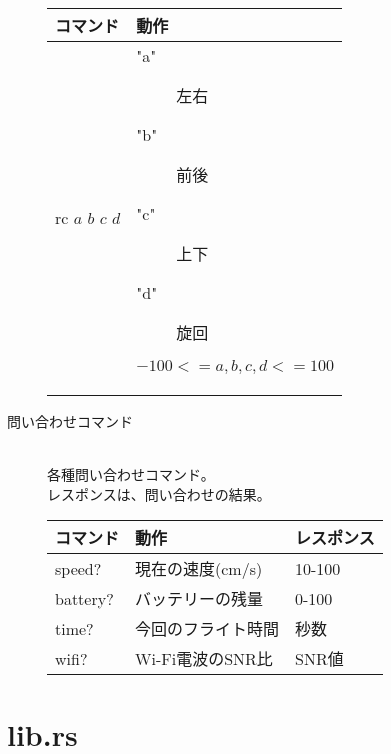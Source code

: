 \documentclass[a4paper, 12pt]{ltjsarticle}
\begin{document}
\begin{description}
        \begin{table}[h]
            \hspace{3\zw}
            \begin{tabular}{ll}
                \hline
                コマンド & 動作 \\ \hline \hline
                rc \(a\) \(b\) \(c\) \(d\) &
                \begin{minipage}{0.45\textwidth}
                    \vspace{0.5\zh}
                    \begin{description}
                        \item["a"] 左右 
                        \item["b"] 前後
                        \item["c"] 上下
                        \item["d"] 旋回
                    \end{description}
                    \( -100 <= a,b,c,d <= 100 \)
                    \vspace{0.5\zh}
                \end{minipage} \\ \hline
            \end{tabular}
        \end{table}
        \clearpage
    \item[問い合わせコマンド]\mbox{} \\
        各種問い合わせコマンド。\\
        レスポンスは、問い合わせの結果。
        \begin{table}[h]
            \hspace{3\zw}
            \begin{tabular}{lll}
                コマンド & 動作 & レスポンス \\ \hline \hline
                speed? & 現在の速度(cm/s) & 10-100 \\ \hline
                battery? & バッテリーの残量 & 0-100 \\ \hline
                time? & 今回のフライト時間 & 秒数 \\ \hline
                wifi? & Wi-Fi電波のSNR比 & SNR値 \\ \hline
            \end{tabular}
        \end{table}
\end{description}
\clearpage


\section {lib.rs}

\end{document}
